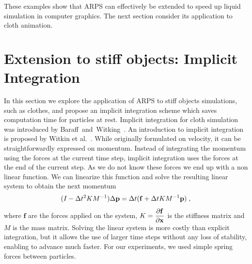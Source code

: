 These examples show that ARPS can effectively be extended to speed up liquid simulation in computer graphics. The next section consider its application to cloth animation.

\section{Extension to stiff objects: Implicit Integration} 
\label{sec:arps_implicit}
In this section we explore the application of ARPS to stiff objects simulations, such as clothes, and propose an implicit integration scheme which saves computation time for particles at rest.
Implicit integration for cloth simulation was introduced by Baraff~and~Witking~\cite{Baraff1998}. 
An introduction to implicit integration is proposed by Witkin et al.~\cite{Witkin2001}.
While originally formulated on velocity, it can be straightforwardly expressed on momentum.
Instead of integrating the momentum using the forces at the current time step, implicit integration uses the forces at the end of the current step.
As we do not know these forces we end up with a non linear function.
We can linearize this function and solve the resulting linear system to obtain the next momentum
\begin{equation}
    \label{eq:implicit}
    ( I -\Delta t^{2}KM^{-1} ) \Delta \mathbf{p} = \Delta t( \mathbf{f} + \Delta t KM^{-1}\mathbf{p} ) \;,
\end{equation}
where $\mathbf{f}$ are the forces applied on the system, $\displaystyle K = \frac{\partial \mathbf{f}}{ \partial \mathbf{x}}$ is the stiffness matrix and $M$ is the mass matrix. 
Solving the linear system is more costly than explicit integration, but it allows the use of larger time steps without any loss of stability, enabling to advance much faster.
For our experiments, we used simple spring forces between particles.
